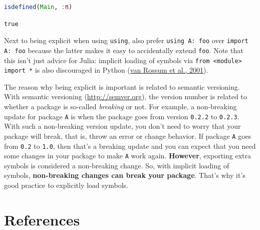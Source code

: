 \documentclass[
  notoc %
]{tufte-book}
\newcommand{\passthrough}[1]{#1}
\begin{document}
\begin{lstlisting}[language=Julia]
isdefined(Main, :π)
\end{lstlisting}

\begin{lstlisting}[language=Output]
true
\end{lstlisting}

Next to being explicit when using \passthrough{\lstinline!using!}, also
prefer \passthrough{\lstinline!using A: foo!} over
\passthrough{\lstinline!import A: foo!} because the latter makes it easy
to accidentally extend \passthrough{\lstinline!foo!}. Note that this
isn't just advice for Julia: implicit loading of symbols via
\passthrough{\lstinline!from <module> import *!} is also discouraged in
Python (\protect\hyperlink{ref-pep8}{van Rossum et al., 2001}).

The reason why being explicit is important is related to semantic
versioning. With semantic versioning (\url{http://semver.org}), the
version number is related to whether a package is so-called
\emph{breaking} or not. For example, a non-breaking update for package
\passthrough{\lstinline!A!} is when the package goes from version
\passthrough{\lstinline!0.2.2!} to \passthrough{\lstinline!0.2.3!}. With
such a non-breaking version update, you don't need to worry that your
package will break, that is, throw an error or change behavior. If
package \passthrough{\lstinline!A!} goes from
\passthrough{\lstinline!0.2!} to \passthrough{\lstinline!1.0!}, then
that's a breaking update and you can expect that you need some changes
in your package to make \passthrough{\lstinline!A!} work again.
\textbf{However}, exporting extra symbols is considered a non-breaking
change. So, with implicit loading of symbols, \textbf{non-breaking
changes can break your package}. That's why it's good practice to
explicitly load symbols.

\hypertarget{references}{%
\chapter*{References}\label{references}}
\end{document}
